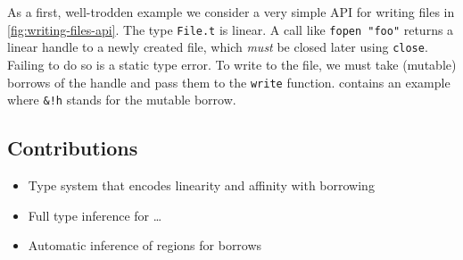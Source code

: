 As a first, well-trodden example we consider a very simple API for
writing files in \cref{fig:writing-files-api}.
The type \lstinline/File.t/ is linear. A call like
\lstinline/fopen "foo"/ returns a linear handle to a newly created
file, which \emph{must} be closed later using
\lstinline/close/. Failing to do so is a static type error.
To write to the file, we must take (mutable) borrows of the handle and
pass them to the \lstinline/write/
function.  contains an example where
\lstinline/&!h/ stands for the mutable borrow.

\subsection{Contributions}
\label{sec:contributions}

\begin{itemize}
\item Type system that encodes linearity and affinity with borrowing
\item Full type inference for \dots
\item Automatic inference of regions for borrows
\end{itemize}


